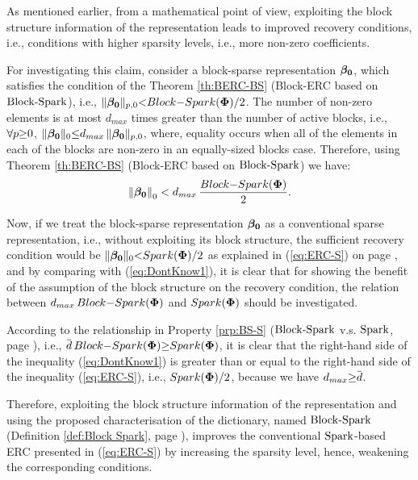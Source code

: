 As mentioned earlier, from a mathematical point of view, exploiting the block structure information of the representation leads to improved recovery conditions, i.e., conditions with higher sparsity levels, i.e., more non-zero coefficients.

For investigating this claim, consider a block-sparse representation $\boldsymbol{\beta_0}$, which satisfies the condition of the Theorem \ref{th:BERC-BS} (Block-ERC based on $\mathrm{Block\text{{-}}Spark}$), i.e., $\Vert \boldsymbol{\beta_0} \Vert_{p,0} {<} Block{-}Spark(\boldsymbol{\Phi})/2$.
The number of non-zero elements is at most $d_{max}$ times greater than the number of active blocks, i.e., $\forall p {\geq} 0$, $\Vert \boldsymbol{\beta_0} \Vert_{0} {\leq} d_{max} \, \Vert \boldsymbol{\beta_0} \Vert_{p,0}$, where, equality occurs when all of the elements in each of the blocks are non-zero in an equally-sized blocks case. 
Therefore, using Theorem \ref{th:BERC-BS} (Block-ERC based on $\mathrm{Block\text{{-}}Spark}$) we have:
\begin{equation}
\label{eq:DontKnow1}
\left\lVert\boldsymbol{\beta_0}\right\rVert_{0} < d_{max} \, \frac{Block{-}Spark(\boldsymbol{\Phi})}{2}.
\end{equation}

Now, if we treat the block-sparse representation $\boldsymbol{\beta_0}$ as a conventional sparse representation, i.e., without exploiting its block structure, the sufficient recovery condition would be $\Vert \boldsymbol{\beta_0}\Vert_0 {<} Spark(\boldsymbol{\Phi})/2$ as explained in (\ref{eq:ERC-S}) on page \pageref{eq:ERC-S}, and by comparing with (\ref{eq:DontKnow1}), it is clear that for showing the benefit of the assumption of the block structure on the recovery condition, the relation between $d_{max} \, Block{-}Spark(\boldsymbol{\Phi})$ and $Spark(\boldsymbol{\Phi})$ should be investigated.

According to the relationship in Property \ref{prp:BS-S} ($\mathrm{Block\text{{-}}Spark}$ v.s. $\mathrm{Spark}$, page \pageref{prp:BS-S}), i.e., $\overbar{d} \, \myBSpkMath \sgeq \mySpkMath$, it is clear that the right-hand side of the inequality (\ref{eq:DontKnow1}) is greater than or equal to the right-hand side of the inequality (\ref{eq:ERC-S}), i.e., $Spark(\boldsymbol{\Phi}) {/} 2$, because we have $d_{max} \sgeq \overbar{d}$. 

Therefore, exploiting the block structure information of the representation and using the proposed characterisation of the dictionary, named $\mathrm{Block\text{{-}}Spark}$ (Definition \ref{def:Block Spark}, page \pageref{def:Block Spark}), improves the conventional $\mathrm{Spark}$-based ERC presented in (\ref{eq:ERC-S}) by increasing the sparsity level, hence, weakening the corresponding conditions.